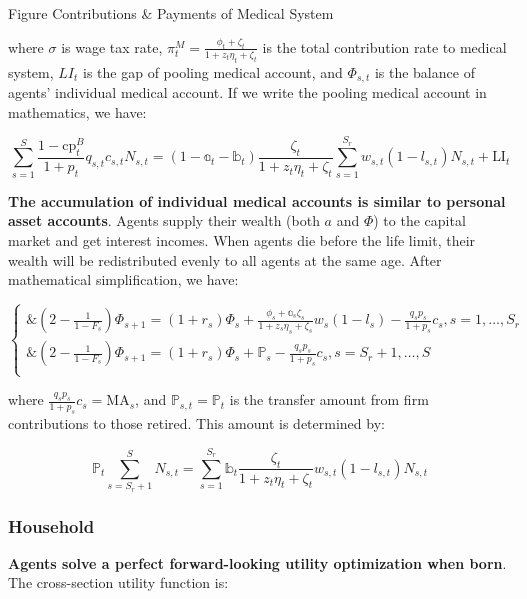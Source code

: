Figure Contributions \& Payments of Medical System

where \(\sigma\) is wage tax rate,
\(\pi_{t}^{M} = \frac{\phi_{t} + \zeta_{t}}{1 + z_{t}\eta_{t} + \zeta_{t}}\)
is the total contribution rate to medical system, \(LI_{t}\) is the gap
of pooling medical account, and \(\Phi_{s,t}\) is the balance of agents'
individual medical account. If we write the pooling medical account in
mathematics, we have:

\[\sum_{s = 1}^{S}{\frac{1 - \text{cp}_{t}^{B}}{1 + p_{t}}q_{s,t}c_{s,t}N_{s,t}} = \left( 1 - \mathbb{a}_{t} - \mathbb{b}_{t} \right)\frac{\zeta_{t}}{1 + z_{t}\eta_{t} + \zeta_{t}}\sum_{s = 1}^{S_{r}}{w_{s,t}\left( 1 - l_{s,t} \right)N_{s,t}} + \text{LI}_{t}\]

\textbf{The accumulation of individual medical accounts is similar to
personal asset accounts}. Agents supply their wealth (both \(a\) and
\(\Phi\)) to the capital market and get interest incomes. When agents
die before the life limit, their wealth will be redistributed evenly to
all agents at the same age. After mathematical simplification, we have:

\[\left\{ \begin{matrix}
\&\left( 2 - \frac{1}{1 - F_{s}} \right)\Phi_{s + 1} = \left( 1 + r_{s} \right)\Phi_{s} + \frac{\phi_{s} + \mathbb{a}_{s}\zeta_{s}}{1 + z_{s}\eta_{s} + \zeta_{s}}w_{s}\left( 1 - l_{s} \right) - \frac{q_{s}p_{s}}{1 + p_{s}}c_{s},s = 1,\ldots,S_{r} \\
\&\left( 2 - \frac{1}{1 - F_{s}} \right)\Phi_{s + 1} = \left( 1 + r_{s} \right)\Phi_{s} + \mathbb{P}_{s} - \frac{q_{s}p_{s}}{1 + p_{s}}c_{s},s = S_{r} + 1,\ldots,S \\
\end{matrix} \right.\ \]

where \(\frac{q_{s}p_{s}}{1 + p_{s}}c_{s} = \text{MA}_{s}\), and
\(\mathbb{P}_{s,t} = \mathbb{P}_{t}\) is the transfer amount from firm
contributions to those retired. This amount is determined by:

\[\mathbb{P}_{t}\sum_{s = S_{r} + 1}^{S}N_{s,t} = \sum_{s = 1}^{S_{r}}{\mathbb{b}_{t}\frac{\zeta_{t}}{1 + z_{t}\eta_{t} + \zeta_{t}}w_{s,t}\left( 1 - l_{s,t} \right)N_{s,t}}\]

\hypertarget{household}{%
\subsubsection{Household}\label{household}}

\textbf{Agents solve a perfect forward-looking utility optimization when
born}. The cross-section utility function is:

